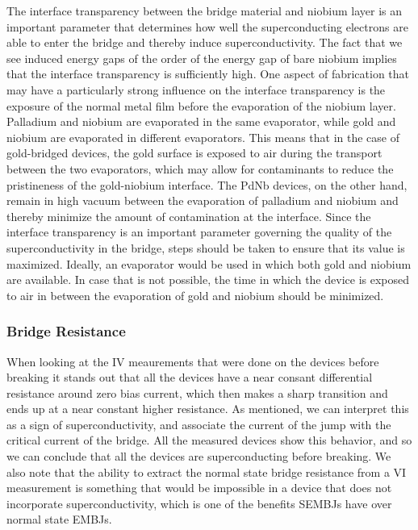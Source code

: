 The interface transparency between the bridge material and niobium layer is an important parameter that determines how well the superconducting electrons are able to enter the bridge and thereby induce superconductivity. The fact that we see induced energy gaps of the order of the energy gap of bare niobium implies that the interface transparency is sufficiently high. One aspect of fabrication that may have a particularly strong influence on the interface transparency is the exposure of the normal metal film before the evaporation of the niobium layer. Palladium and niobium are evaporated in the same evaporator, while gold and niobium are evaporated in different evaporators. This means that in the case of gold-bridged devices, the gold surface is exposed to air during the transport between the two evaporators, which may allow for contaminants to reduce the pristineness of the gold-niobium interface. The PdNb devices, on the other hand, remain in high vacuum between the evaporation of palladium and niobium and thereby minimize the amount of contamination at the interface. Since the interface transparency is an important parameter governing the quality of the superconductivity in the bridge, steps should be taken to ensure that its value is maximized. Ideally, an evaporator would be used in which both gold and niobium are available. In case that is not possible, the time in which the device is exposed to air in between the evaporation of gold and niobium should be minimized. \\

  






\iffalse
\subsubsection*{Bridge Resistance}

When looking at the IV meaurements that were done on the devices before breaking it stands out that all the devices have a near consant differential resistance around zero bias current, which then makes a sharp transition and ends up at a near constant higher resistance. As mentioned, we can interpret this as a sign of superconductivity, and associate the current of the jump with the critical current of the bridge. All the measured devices show this behavior, and so we can conclude that all the devices are superconducting before breaking. We also note that the ability to extract the normal state bridge resistance from a VI measurement is something that would be impossible in a device that does not incorporate superconductivity, which is one of the benefits SEMBJs have over normal state EMBJs. 


